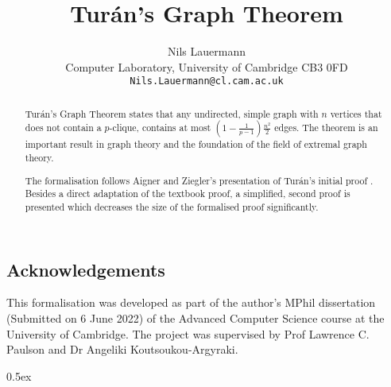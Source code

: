 \documentclass[11pt,a4paper]{article}
\begin{document}
\title{Turán's Graph Theorem}
\author{Nils Lauermann\\
Computer Laboratory, University of Cambridge CB3 0FD\\
\texttt{Nils.Lauermann@cl.cam.ac.uk}}
\maketitle

\begin{abstract}
  Turán's Graph Theorem \cite{turan1941external} states that any undirected, simple graph with $n$ vertices that does not contain a $p$-clique, contains at most $\left( 1 - \frac{1}{p-1} \right) \frac{n^2}{2}$ edges.
The theorem is an important result in graph theory and the foundation of the field of extremal graph theory.

The formalisation follows Aigner and Ziegler's \cite{Aigner2018} presentation of Turán's initial proof \cite{turan1941external}.
Besides a direct adaptation of the textbook proof, a simplified, second proof is presented which decreases the size of the formalised proof significantly.
\end{abstract}

\tableofcontents

\subsection*{Acknowledgements}

This formalisation was developed as part of the author's MPhil dissertation (Submitted on 6 June 2022) of the Advanced Computer Science course at the University of Cambridge.
The project was supervised by Prof Lawrence C. Paulson and Dr Angeliki Koutsoukou-Argyraki.



\newpage

\parindent 0pt\parskip 0.5ex


\end{document}
